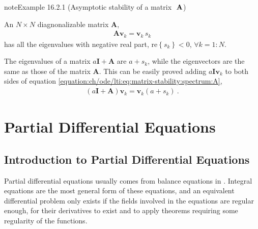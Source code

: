 \documentclass[letterpaper,10pt,english]{jupyterBook}
\begin{document}
\begin{sphinxadmonition}{note}{Example 16.2.1 (Asymptotic stability of a matrix \protect\(\ \mathbf{A}\protect\))}



\sphinxAtStartPar
An \(N \times N\) diagnonalizable matrix \(\mathbf{A}\),
\begin{equation}\label{equation:ch/ode/lti:eq:matrix-stability:spectrum:A}
\begin{split}\mathbf{A} \mathbf{v}_k = \mathbf{v}_k \, s_k\end{split}
\end{equation}
\sphinxAtStartPar
has all the eigenvalues with negative real part, \(\text{re}\left\{ s_k \right\} < 0\), \(\forall k=1:N\).

\sphinxAtStartPar
The eigenvalues of a matrix \(a \mathbf{I} + \mathbf{A}\) are \(a + s_k\), while the eigenvectors are the same as those of the matrix \(\mathbf{A}\). This can be easily proved adding \(a \mathbf{I} \mathbf{v}_k\) to both sides of equation \eqref{equation:ch/ode/lti:eq:matrix-stability:spectrum:A},
\begin{equation*}
\begin{split}\left( a \mathbf{I} + \mathbf{A} \right) \mathbf{v}_k = \mathbf{v}_k (a + s_k) \ .\end{split}
\end{equation*}\end{sphinxadmonition}

\sphinxAtStartPar
{}

\sphinxstepscope


\part{Partial Differential Equations}

\sphinxstepscope


\chapter{Introduction to Partial Differential Equations}
\label{\detokenize{ch/pde/intro:introduction-to-partial-differential-equations}}\label{\detokenize{ch/pde/intro:pde}}\label{\detokenize{ch/pde/intro::doc}}
\sphinxAtStartPar
Partial differential equations usually comes from balance equations in . Integral equations are the most general form of these equations, and an equivalent differential problem only exists if the fields involved in the equations are regular enough, for their derivatives to exist \sphinxhyphen{} and to apply theorems requiring some regularity of the functions.
\end{document}
